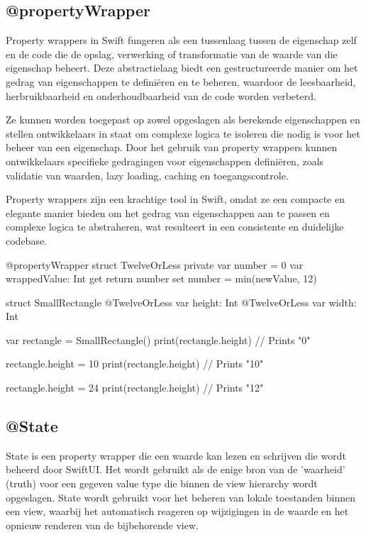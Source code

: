 \subsection{@propertyWrapper}
\autocite{ApplePropertyWrapper} Property wrappers in Swift fungeren als een tussenlaag tussen de eigenschap zelf en de code die de opslag, verwerking of transformatie van de waarde van die eigenschap beheert. Deze abstractielaag biedt een gestructureerde manier om het gedrag van eigenschappen te definiëren en te beheren, waardoor de leesbaarheid, herbruikbaarheid en onderhoudbaarheid van de code worden verbeterd.

Ze kunnen worden toegepast op zowel opgeslagen als berekende eigenschappen en stellen ontwikkelaars in staat om complexe logica te isoleren die nodig is voor het beheer van een eigenschap. Door het gebruik van property wrappers kunnen ontwikkelaars specifieke gedragingen voor eigenschappen definiëren, zoals validatie van waarden, lazy loading, caching en toegangscontrole.

Property wrappers zijn een krachtige tool in Swift, omdat ze een compacte en elegante manier bieden om het gedrag van eigenschappen aan te passen en complexe logica te abstraheren, wat resulteert in een consistente en duidelijke codebase.
\begin{swift}[caption=Example property wrapper code, label=property_wrapper_example]
    @propertyWrapper
    struct TwelveOrLess {
        private var number = 0
        var wrappedValue: Int {
            get { return number }
            set { number = min(newValue, 12) }
        }
    }
    
    struct SmallRectangle {
        @TwelveOrLess var height: Int
        @TwelveOrLess var width: Int
    }
    
    
    var rectangle = SmallRectangle()
    print(rectangle.height)
    // Prints "0"
    
    
    rectangle.height = 10
    print(rectangle.height)
    // Prints "10"
    
    
    rectangle.height = 24
    print(rectangle.height)
    // Prints "12"
\end{swift}


\subsection{@State}
\autocite{AppleState} State is een property wrapper die een waarde kan lezen en schrijven die wordt beheerd door SwiftUI. Het wordt gebruikt als de enige bron van de 'waarheid' (truth) voor een gegeven value type die binnen de view hierarchy wordt opgeslagen. State wordt gebruikt voor het beheren van lokale toestanden binnen een view, waarbij het automatisch reageren op wijzigingen in de waarde en het opnieuw renderen van de bijbehorende view.

